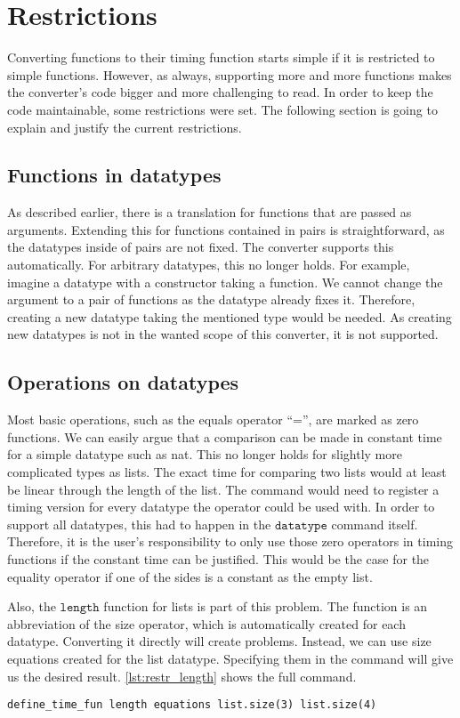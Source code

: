 
\section{Restrictions} \label{chapter:restrictions}

Converting functions to their timing function starts simple if it is restricted to simple functions.
However, as always, supporting more and more functions makes the converter's code bigger and more challenging to read.
In order to keep the code maintainable, some restrictions were set.
The following section is going to explain and justify the current restrictions.

\subsection{Functions in datatypes}
As described earlier, there is a translation for functions that are passed as arguments.
Extending this for functions contained in pairs is straightforward, as the datatypes inside of pairs are not fixed.
The converter supports this automatically.
For arbitrary datatypes, this no longer holds.
For example, imagine a datatype with a constructor taking a function.
We cannot change the argument to a pair of functions as the datatype already fixes it.
Therefore, creating a new datatype taking the mentioned type would be needed.
As creating new datatypes is not in the wanted scope of this converter, it is not supported.

\subsection{Operations on datatypes} \label{chapter:nonconstant_zeros}
Most basic operations, such as the equals operator ``='', are marked as zero functions.
We can easily argue that a comparison can be made in constant time for a simple datatype such as nat.
This no longer holds for slightly more complicated types as lists.
The exact time for comparing two lists would at least be linear through the length of the list.
The command would need to register a timing version for every datatype the operator could be used with.
In order to support all datatypes, this had to happen in the $\texttt{datatype}$ command itself.
Therefore, it is the user's responsibility to only use those zero operators in timing functions if the constant time can be justified.
This would be the case for the equality operator if one of the sides is a constant as the empty list.

Also, the $\texttt{length}$ function for lists is part of this problem.
The function is an abbreviation of the size operator, which is automatically created for each datatype.
Converting it directly will create problems.
Instead, we can use size equations created for the list datatype.
Specifying them in the command will give us the desired result.
\autoref{lst:restr_length} shows the full command.
\begin{lstlisting}[language=isabelle,float,label=lst:restr_length,caption=Converting the length function correctly]
  define_time_fun length equations list.size(3) list.size(4)
\end{lstlisting}

